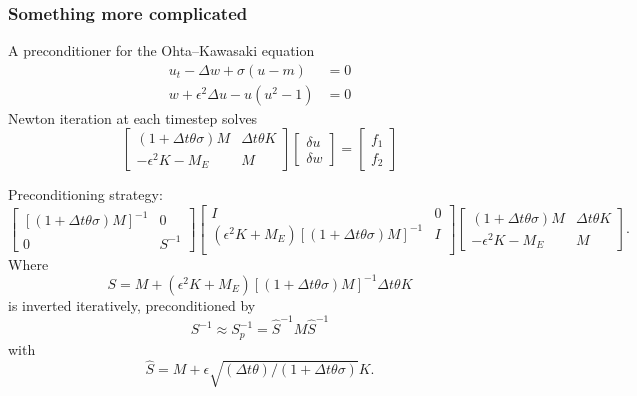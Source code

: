 \documentclass[presentation,aspectratio=43]{beamer}
\begin{document}
\begin{frame}[allowframebreaks]
  \frametitle{Something more complicated}
  A preconditioner for the Ohta--Kawasaki equation
  \parencite{Farrell:2016}
  \begin{equation*}
    \begin{split}
      u_t - \Delta w + \sigma(u - m) &= 0\\
      w + \epsilon^2 \Delta u - u(u^2 - 1) &= 0
    \end{split}
  \end{equation*}
  Newton iteration at each timestep solves
  \begin{equation*}
    \begin{bmatrix}
      (1 + \Delta t \theta \sigma)M  & \Delta t\theta K \\
      -\epsilon^2 K - M_E & M
    \end{bmatrix}
    \begin{bmatrix}
      \delta u \\
      \delta w
    \end{bmatrix} =
    \begin{bmatrix}
      f_1 \\
      f_2
    \end{bmatrix}
  \end{equation*}
  \pagebreak

  Preconditioning strategy:
  {\scriptsize
    \begin{equation*}
      \begin{bmatrix}
        \left[(1 + \Delta t \theta \sigma)M\right]^{-1}  & 0 \\
        0 & S^{-1}
      \end{bmatrix}
      \begin{bmatrix}
        I & 0\\
        (\epsilon^2 K + M_E)\left[(1 + \Delta t \theta
          \sigma)M\right]^{-1} & I\\
      \end{bmatrix}
      \begin{bmatrix}
        (1 + \Delta t \theta \sigma)M  & \Delta t\theta K \\
        -\epsilon^2 K - M_E & M
      \end{bmatrix}.
    \end{equation*}
  }
  Where
  \begin{equation*}
    S = M + (\epsilon^2 K + M_E) \left[(1 + \Delta t\theta\sigma)M\right]^{-1} \Delta t \theta K
  \end{equation*}
  is inverted iteratively, preconditioned by
  \begin{equation*}
    S^{-1} \approx S_p^{-1} = \hat{S}^{-1}M\hat{S}^{-1}
  \end{equation*}
  with
  \begin{equation*}
    \hat{S} = M + \epsilon\sqrt{(\Delta t \theta)/(1+\Delta t \theta\sigma)} K.
  \end{equation*}
\end{frame}
\end{document}
